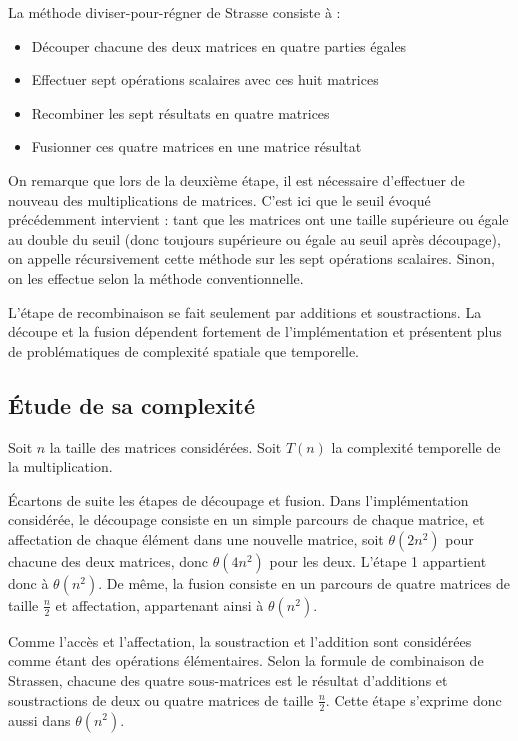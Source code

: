 \documentclass[10pt,a4paper]{article}
\begin{document}
La méthode diviser-pour-régner de Strasse consiste à :

\begin{itemize}
	\item Découper chacune des deux matrices en quatre parties égales
	\item Effectuer sept opérations scalaires avec ces huit matrices
	\item Recombiner les sept résultats en quatre matrices
	\item Fusionner ces quatre matrices en une matrice résultat
\end{itemize}

On remarque que lors de la deuxième étape, il est nécessaire d'effectuer de nouveau des multiplications de matrices. C'est ici que le seuil évoqué précédemment intervient : tant que les matrices ont une taille supérieure ou égale au double du seuil (donc toujours supérieure ou égale au seuil après découpage), on appelle récursivement cette méthode sur les sept opérations scalaires. Sinon, on les effectue selon la méthode conventionnelle.

L'étape de recombinaison se fait seulement par additions et soustractions. La découpe et la fusion dépendent fortement de l'implémentation et présentent plus de problématiques de complexité spatiale que temporelle.

\subsection{Étude de sa complexité}

Soit $ n $ la taille des matrices considérées. Soit $ T(n) $ la complexité temporelle de la multiplication.

Écartons de suite les étapes de découpage et fusion. Dans l'implémentation considérée, le découpage consiste en un simple parcours de chaque matrice, et affectation de chaque élément dans une nouvelle matrice, soit $ \theta (2n^{2}) $ pour chacune des deux matrices, donc $ \theta (4n^{2}) $ pour les deux. L'étape 1 appartient donc à $ \theta (n^{2}) $. De même, la fusion consiste en un parcours de quatre matrices de taille $ \frac{n}{2} $ et affectation, appartenant ainsi à $ \theta (n^{2}) $.

Comme l'accès et l'affectation, la soustraction et l'addition sont considérées comme étant des opérations élémentaires. Selon la formule de combinaison de Strassen, chacune des quatre sous-matrices est le résultat d'additions et soustractions de deux ou quatre matrices de taille $ \frac{n}{2} $. Cette étape s'exprime donc aussi dans $ \theta (n^{2}) $.
\end{document}
